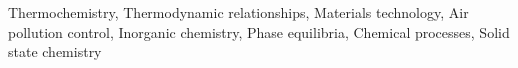 \documentclass[]{article}
\begin{document}
Thermochemistry, Thermodynamic relationships, Materials technology, Air pollution control, Inorganic chemistry, Phase equilibria, Chemical processes, Solid state chemistry
\end{document}
